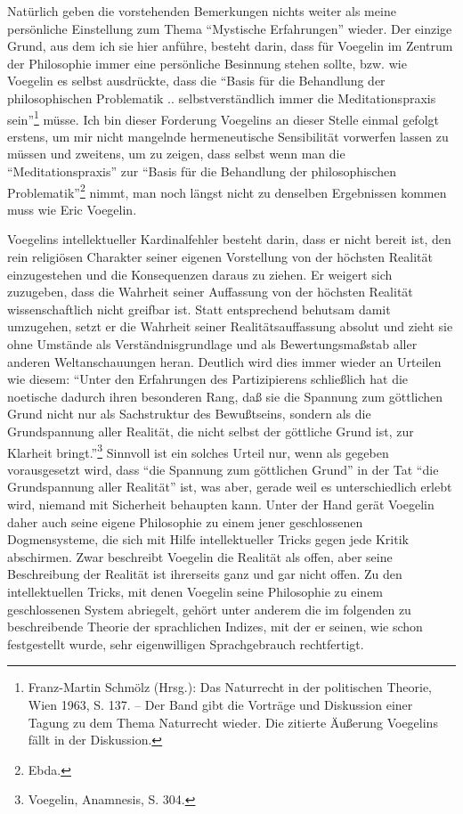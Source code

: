  Natürlich geben die vorstehenden Bemerkungen nichts weiter als meine
 persönliche Einstellung zum Thema "`Mystische Erfahrungen"' wieder. Der
 einzige Grund, aus dem ich sie hier anführe, besteht darin, dass für Voegelin
 im Zentrum der Philosophie immer eine persönliche Besinnung stehen sollte,
 bzw. wie Voegelin es selbst ausdrückte, dass die "`Basis für die Behandlung
 der philosophischen Problematik ..  selbstverständlich immer die
 Meditationspraxis sein"'\footnote{Franz-Martin Schmölz (Hrsg.): Das
   Naturrecht in der politischen Theorie, Wien 1963, S. 137. -- Der Band gibt
   die Vorträge und Diskussion einer Tagung zu dem Thema Naturrecht wieder.
   Die zitierte Äußerung Voegelins fällt in der Diskussion.} müsse. Ich bin
 dieser Forderung Voegelins an dieser Stelle einmal gefolgt erstens, um mir
 nicht mangelnde hermeneutische Sensibilität vorwerfen lassen zu müssen und
 zweitens, um zu zeigen, dass selbst wenn man die "`Meditationspraxis"' zur
 "`Basis für die Behandlung der philosophischen Problematik"'\footnote{Ebda.}
 nimmt, man noch längst nicht zu denselben Ergebnissen kommen muss wie Eric
 Voegelin.

 Voegelins intellektueller Kardinalfehler besteht darin, dass er nicht bereit
 ist, den rein religiösen Charakter seiner eigenen Vorstellung von der
 höchsten Realität einzugestehen und die Konsequenzen daraus zu ziehen. Er
 weigert sich zuzugeben, dass die Wahrheit seiner Auf\/fassung von der
 höchsten Realität wissenschaftlich nicht greifbar ist. Statt entsprechend
 behutsam damit umzugehen, setzt er die Wahrheit seiner Realitätsauf\/fassung
 absolut und zieht sie ohne Umstände als Verständnisgrundlage und als
 Bewertungsmaßstab aller anderen Weltanschauungen heran. Deutlich wird dies
 immer wieder an Urteilen wie diesem: "`Unter den Erfahrungen des
 Partizipierens schließlich hat die noetische dadurch ihren besonderen Rang,
 daß sie die Spannung zum göttlichen Grund nicht nur als Sachstruktur des
 Bewußtseins, sondern als die Grundspannung aller Realität, die nicht selbst
 der göttliche Grund ist, zur Klarheit bringt."'\footnote{Voegelin, Anamnesis,
   S. 304.} Sinnvoll ist ein solches Urteil nur, wenn als gegeben
 vorausgesetzt wird, dass "`die Spannung zum göttlichen Grund"' in der Tat
 "`die Grundspannung aller Realität"' ist, was aber, gerade weil es
 unterschiedlich erlebt wird, niemand mit Sicherheit behaupten kann.  Unter
 der Hand gerät Voegelin daher auch seine eigene Philosophie zu einem jener
 geschlossenen Dogmensysteme, die sich mit Hilfe intellektueller Tricks gegen
 jede Kritik abschirmen. Zwar beschreibt Voegelin die Realität als offen, aber
 seine Beschreibung der Realität ist ihrerseits ganz und gar nicht offen. Zu
 den intellektuellen Tricks, mit denen Voegelin seine Philosophie zu einem
 geschlossenen System abriegelt, gehört unter anderem die im folgenden zu
 beschreibende Theorie der sprachlichen Indizes, mit der er seinen, wie schon
 festgestellt wurde, sehr eigenwilligen Sprachgebrauch rechtfertigt.

